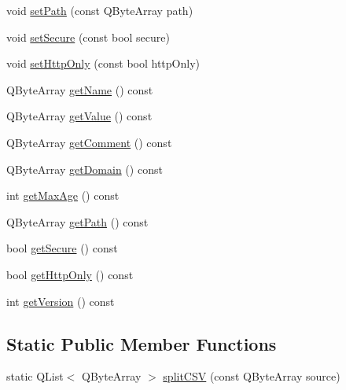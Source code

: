 \begin{DoxyCompactItemize}
void \mbox{\hyperlink{classstefanfrings_1_1_http_cookie_a9e9cdfa3b356d95d9accb5ed8f5745e9}{set\+Path}} (const Q\+Byte\+Array path)
\item 
void \mbox{\hyperlink{classstefanfrings_1_1_http_cookie_a92a304128210efa82e317ee26fd041c5}{set\+Secure}} (const bool secure)
\item 
void \mbox{\hyperlink{classstefanfrings_1_1_http_cookie_ae1fa9c390bc258599680e06b53902273}{set\+Http\+Only}} (const bool http\+Only)
\item 
Q\+Byte\+Array \mbox{\hyperlink{classstefanfrings_1_1_http_cookie_abecd0373e90e3701e82bb4dc630c54a7}{get\+Name}} () const
\item 
Q\+Byte\+Array \mbox{\hyperlink{classstefanfrings_1_1_http_cookie_a04d3cdafe9c7e5f9068816abf33aa4a9}{get\+Value}} () const
\item 
Q\+Byte\+Array \mbox{\hyperlink{classstefanfrings_1_1_http_cookie_ad48e447c1d4dfbed9e81713016ca0531}{get\+Comment}} () const
\item 
Q\+Byte\+Array \mbox{\hyperlink{classstefanfrings_1_1_http_cookie_aeaafc0d8651b07c94d1ed247a4e23dff}{get\+Domain}} () const
\item 
int \mbox{\hyperlink{classstefanfrings_1_1_http_cookie_a3a55c75cb4220b303cbed4713f538995}{get\+Max\+Age}} () const
\item 
Q\+Byte\+Array \mbox{\hyperlink{classstefanfrings_1_1_http_cookie_a3796862a6c50124eb5c987dd617a097c}{get\+Path}} () const
\item 
bool \mbox{\hyperlink{classstefanfrings_1_1_http_cookie_a270cd78805263b5ed80f4e3354caf4e4}{get\+Secure}} () const
\item 
bool \mbox{\hyperlink{classstefanfrings_1_1_http_cookie_ab465f5485b1115ba8ead0809fcb71510}{get\+Http\+Only}} () const
\item 
int \mbox{\hyperlink{classstefanfrings_1_1_http_cookie_ac390582430915aa5570c6a397f20210d}{get\+Version}} () const
\end{DoxyCompactItemize}
\subsection*{Static Public Member Functions}
\begin{DoxyCompactItemize}
\item 
static Q\+List$<$ Q\+Byte\+Array $>$ \mbox{\hyperlink{classstefanfrings_1_1_http_cookie_a90009f1b886162d08cc7ead31d6d8209}{split\+C\+SV}} (const Q\+Byte\+Array source)
\end{DoxyCompactItemize}


